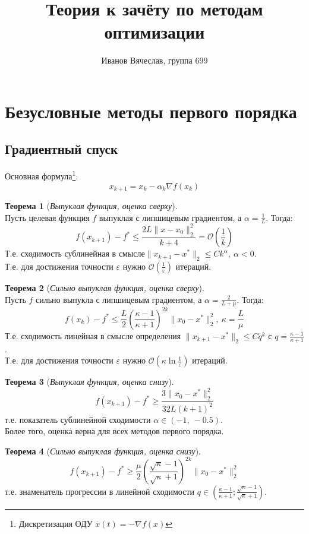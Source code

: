 \documentclass[11pt,a4paper]{report}
\title{Теория к зачёту по методам оптимизации}
\author{Иванов Вячеслав, группа 699}
\def\eps{\varepsilon}
\def\le{\leqslant}
\def\ge{\geqslant}
\theoremstyle{definition}
\theoremstyle{definition}
\newtheorem{theorem}{Теорема}[section]
\theoremstyle{definition}
\begin{document}
	\setlength{\parindent}{1cm}
	{\let\newpage\relax\maketitle}
	\tableofcontents
	\newpage
	\section{Безусловные методы первого порядка}
	\subsection{Градиентный спуск}
	Основная формула\footnote{Дискретизация ОДУ $ \stackrel{.}{x}(t) = -\nabla f(x) $}:
	$$
		x_{k+1} = x_{k} - \alpha_k \nabla f(x_k)
	$$
	\begin{theorem}[\textit{Выпуклая функция, оценка сверху}]$  $\\
		Пусть целевая функция $ f $ выпуклая с липшицевым градиентом, а $ \alpha = \frac{1}{L} $. Тогда:
		$$
			f(x_{k+1}) - f^{*} \le \frac{2L \| x - x_0 \|^2_2}{k+4} = \mathcal{O} \left (\frac{1}{k}\right )
		$$
		Т.е. сходимость сублинейная в смысле$ \| x_{k+1} - x^{*} \|_2 \le Ck^{\alpha},\ \alpha < 0 $.\\
		Т.е. для достижения точности $ \eps $ нужно $ \mathcal{O}\left( \frac{1}{\eps} \right) $ итераций.
	\end{theorem}
	\begin{theorem}[\textit{Сильно выпуклая функция, оценка сверху}]$ $\\
		Пусть $ f $ сильно выпукла с липшицевым градиентом, а $ \alpha = \frac{2}{L + \mu} $. Тогда:
		$$
			f(x_k) - f^{*} \le \frac{L}{2} \left ( \frac{\kappa - 1}{\kappa + 1} \right )^{2k} \| x_0 - x^* \|_2^2,\ \kappa = \frac{L}{\mu}
		$$
		Т.е. сходимость линейная в смысле определения $ \| x_{k+1} - x^{*} \|_2 \le Cq^{k}$ с $ q = \frac{\kappa - 1}{\kappa + 1} $.\\
		Т.е. для достижения точности $ \eps $ нужно $ \mathcal{O}\left( \kappa \ln \frac{1}{\eps} \right) $ итераций.
	\end{theorem}
	\begin{theorem}[\textit{Выпуклая функция, оценка снизу}]$  $\\
		$$
			f(x_{k+1}) - f^{*} \ge \frac{3 \| x_0 - x^* \|_2^2 }{32L(k+1)^2}
		$$
		т.е. показатель сублинейной сходимости $ \alpha \in (-1,\ -0.5) $.\\
		Более того, оценка верна для всех методов первого порядка.
	\end{theorem}
	\begin{theorem}[\textit{Сильно выпуклая функция, оценка снизу}]$  $\\
		$$
			f(x_{k+1}) - f^{*} \ge \frac{\mu}{2} \left (\frac{\sqrt{\kappa} - 1}{\sqrt{\kappa} + 1}\right )^{2k} \| x_0 - x^* \|_2^2 
		$$
		т.е. знаменатель прогрессии в линейной сходимости $ q \in \left (\frac{\kappa - 1}{\kappa + 1}; \frac{\sqrt{\kappa} - 1}{\sqrt{\kappa} + 1}\right ) $.
	\end{theorem}
\end{document}
